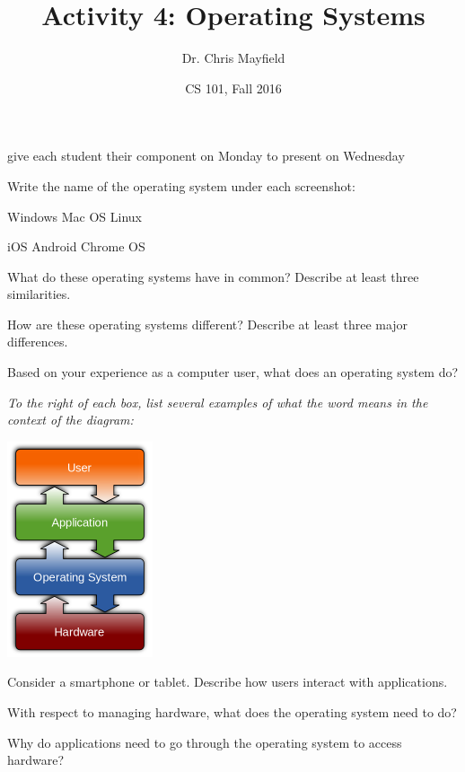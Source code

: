 \documentclass[12pt]{article}
\title{Activity 4: Operating Systems}
\author{Dr. Chris Mayfield}
\date{CS 101, Fall 2016}
\begin{document}
\maketitle

give each student their component on Monday to present on Wednesday


Write the name of the operating system under each screenshot:

Windows
Mac OS
Linux

iOS
Android
Chrome OS


\Q What do these operating systems have in common? Describe at least three similarities.

\Q How are these operating systems different? Describe at least three major differences.

\Q Based on your experience as a computer user, what does an operating system do?



\textit{To the right of each box, list several examples of what the word means in the context of the diagram:}

\bigskip

\includegraphics[height=2.5in]{os_placement.png}


\Q Consider a smartphone or tablet. Describe how users interact with applications.

\Q With respect to managing hardware, what does the operating system need to do?

\Q Why do applications need to go through the operating system to access hardware?
\end{document}
